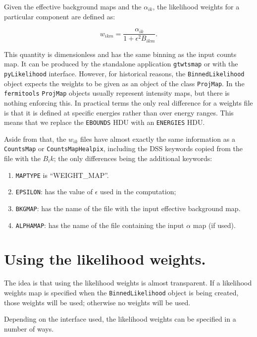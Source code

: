 \documentclass[preprint]{aastex}
\begin{document}
Given the effective background maps and the $\alpha_{ik}$, the
likelihood weights for a particular component are defined as:

\begin{equation}
w_{ikm} = \frac{\alpha_{ik}}{1 + \epsilon^2 B_{ikm}}.
\end{equation}

This quantity is dimensionless and has the same binning as the input
counts map.  It can be produced by the standalone application {\tt gtwtsmap}
or with the {\tt pyLikelihood} interface.  However, for
historical reasons, the {\tt BinnedLikelihood} object expects the
weights to be given as an object of the class {\tt ProjMap}.  In the
{\tt fermitools} {\tt ProjMap} objects usually represent intensity maps,
but there is nothing enforcing this.  In practical terms the only real
difference for a weights file is that it is defined at specific
energies rather than over energy ranges.  This means that we replace
the {\tt EBOUNDS} HDU with an {\tt ENERGIES} HDU.

Aside from that, the $w_{ik}$ files have almost exactly the
same information as a {\tt CountsMap} or {\tt CountsMapHealpix},
including the DSS keywords copied from the file with the $B_ik$; the
only differences being the additional keywords:

\begin{enumerate}
\item{{\tt MAPTYPE} is ``WEIGHT\_MAP''.}
\item{{\tt EPSILON}: has the value of $\epsilon$ used in the computation;}
\item{{\tt BKGMAP}: has the name of the file with the input effective background map.}    
\item{{\tt ALPHAMAP}: has the name of the file containing the input $\alpha$ map (if used).}
\end{enumerate}


\section{Using the likelihood weights.}

The idea is that using the likelihood weights is almost transparent.
If a likelihood weights map is specified when the {\tt BinnedLikelihood}
object is being created, those weights will be used; otherwise no
weights will be used.

Depending on the interface used, the likelihood weights can be
specified in a number of ways.
\end{document}
